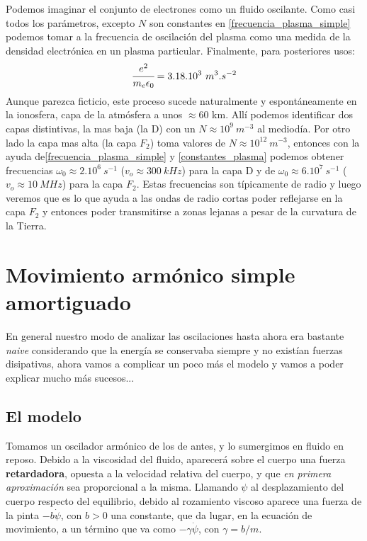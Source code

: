 \documentclass[a4paper,spanish]{article}
\numberwithin{equation}{section}
\begin{document}
Podemos imaginar el conjunto de electrones como un fluido oscilante. Como casi todos los par\'ametros, excepto $N$ son constantes en \ref{frecuencia_plasma_simple} podemos tomar a la frecuencia de oscilaci\'on del plasma como una medida de la densidad electr\'onica en un plasma particular. Finalmente, para posteriores usos:
\begin{equation}
\cfrac{e^2}{m_e\epsilon_0}=3.18.10^3 \ m^3.s^{-2}
\label{constantes_plasma}
\end{equation}
Aunque parezca ficticio, este proceso sucede naturalmente y espont\'aneamente en la ionosfera, capa de la atm\'osfera a unos $\approx 60$ km. All\'i podemos identificar dos capas distintivas, la mas baja (la D)  con un $N \approx 10^9 \ m^{-3}$ al mediod\'ia. Por otro lado la capa mas alta (la capa $F_2$) toma valores de $N \approx 10^{12} \ m^{-3}$, entonces con la ayuda de\ref{frecuencia_plasma_simple} y \ref{constantes_plasma} podemos obtener frecuencias $\omega_0 \approx 2.10^6 \ s^{-1}$ ($v_o \approx 300 \ kHz$) para la capa D y de $\omega_0 \approx 6.10^7 \ s^{-1}$ ($v_o \approx 10 \ MHz$) para la capa $F_2$. Estas frecuencias son t\'ipicamente de radio y luego veremos que es lo que ayuda a las ondas de radio cortas poder reflejarse en la capa $F_2$ y entonces poder transmitirse a zonas lejanas a pesar de la curvatura de la Tierra.  

\section{Movimiento arm\'onico simple amortiguado}

En general nuestro modo de analizar las oscilaciones hasta ahora era bastante \textit{naive} considerando que la energ\'ia se conservaba siempre y no exist\'ian fuerzas disipativas, ahora vamos a complicar un poco m\'as el modelo y vamos a poder explicar mucho m\'as sucesos...

\subsection{El modelo}

Tomamos un oscilador arm\'onico de los de antes, y lo sumergimos en fluido en reposo. Debido a la viscosidad del fluido, aparecer\'a sobre el cuerpo una fuerza \textbf{retardadora}, opuesta a la velocidad relativa del cuerpo, y que \textit{en primera aproximaci\'on} sea proporcional a la misma. Llamando $\psi$ al desplazamiento del cuerpo respecto del equilibrio, debido al rozamiento viscoso aparece una fuerza de la pinta $-b\dot{\psi}$, con $b>0$ una constante, que da lugar, en la ecuaci\'on de movimiento, a un t\'ermino que va como $-\gamma \dot{\psi}$, con $\gamma=b/m$.
\end{document}

